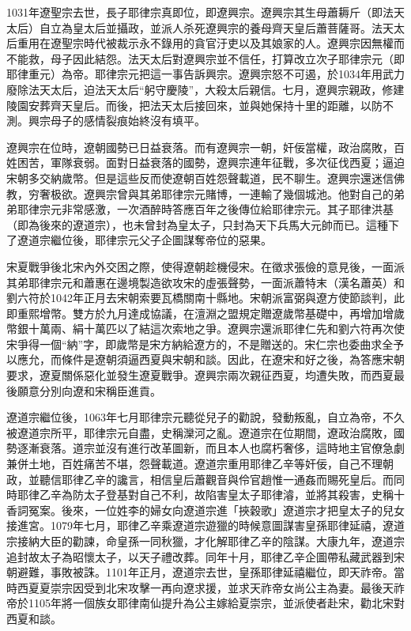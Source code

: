 1031年遼聖宗去世，長子耶律宗真即位，即遼興宗。遼興宗其生母蕭耨斤（即法天太后）自立為皇太后並攝政，並派人杀死遼興宗的養母齊天皇后蕭菩薩哥。法天太后重用在遼聖宗時代被裁示永不錄用的貪官汙吏以及其娘家的人。遼興宗因無權而不能救，母子因此結怨。法天太后對遼興宗並不信任，打算改立次子耶律宗元（即耶律重元）為帝。耶律宗元把這一事告訴興宗。遼興宗怒不可遏，於1034年用武力廢除法天太后，迫法天太后“躬守慶陵”，大殺太后親信。七月，遼興宗親政，修建陵園安葬齊天皇后。而後，把法天太后接回來，並與她保持十里的距離，以防不測。興宗母子的感情裂痕始終沒有填平。

遼興宗在位時，遼朝國勢已日益衰落。而有遼興宗一朝，奸佞當權，政治腐敗，百姓困苦，軍隊衰弱。面對日益衰落的國勢，遼興宗連年征戰，多次征伐西夏；逼迫宋朝多交納歲幣。但是這些反而使遼朝百姓怨聲載道，民不聊生。遼興宗還迷信佛教，穷奢极欲。遼興宗曾與其弟耶律宗元賭博，一連輸了幾個城池。他對自己的弟弟耶律宗元非常感激，一次酒醉時答應百年之後傳位給耶律宗元。其子耶律洪基（即為後來的遼道宗），也未曾封為皇太子，只封為天下兵馬大元帥而已。這種下了遼道宗繼位後，耶律宗元父子企圖謀奪帝位的惡果。

宋夏戰爭後北宋內外交困之際，使得遼朝趁機侵宋。在徵求張儉的意見後，一面派其弟耶律宗元和蕭惠在邊境製造欲攻宋的虛張聲勢，一面派蕭特末（漢名蕭英）和劉六符於1042年正月去宋朝索要瓦橋關南十縣地。宋朝派富弼與遼方使節談判，此即重熙增幣。雙方於九月達成協議，在澶淵之盟規定贈遼歲幣基礎中，再增加增歲幣銀十萬兩、絹十萬匹以了結這次索地之爭。遼興宗還派耶律仁先和劉六符再次使宋爭得一個“納”字，即歲幣是宋方納給遼方的，不是贈送的。宋仁宗也委曲求全予以應允，而條件是遼朝須逼西夏與宋朝和談。因此，在遼宋和好之後，為答應宋朝要求，遼夏關係惡化並發生遼夏戰爭。遼興宗兩次親征西夏，均遭失敗，而西夏最後願意分別向遼和宋稱臣進貢。

遼道宗繼位後，1063年七月耶律宗元聽從兒子的勸說，發動叛亂，自立為帝，不久被遼道宗所平，耶律宗元自盡，史稱灤河之亂。遼道宗在位期間，遼政治腐敗，國勢逐漸衰落。道宗並沒有進行改革圖新，而且本人也腐朽奢侈，這時地主官僚急劇兼併土地，百姓痛苦不堪，怨聲載道。遼道宗重用耶律乙辛等奸佞，自己不理朝政，並聽信耶律乙辛的讒言，相信皇后蕭觀音與伶官趙惟一通姦而賜死皇后。而同時耶律乙辛為防太子登基對自己不利，故陷害皇太子耶律濬，並將其殺害，史稱十香詞冤案。後來，一位姓李的婦女向遼道宗進「挾穀歌」遼道宗才把皇太子的兒女接進宮。1079年七月，耶律乙辛乘遼道宗遊獵的時候意圖謀害皇孫耶律延禧，遼道宗接納大臣的勸諫，命皇孫一同秋獵，才化解耶律乙辛的陰謀。大康九年，遼道宗追封故太子為昭懷太子，以天子禮改葬。同年十月，耶律乙辛企圖帶私藏武器到宋朝避難，事敗被誅。1101年正月，遼道宗去世，皇孫耶律延禧繼位，即天祚帝。當時西夏夏崇宗因受到北宋攻擊一再向遼求援，並求天祚帝女尚公主為妻。最後天祚帝於1105年將一個族女耶律南仙提升為公主嫁給夏崇宗，並派使者赴宋，勸北宋對西夏和談。

